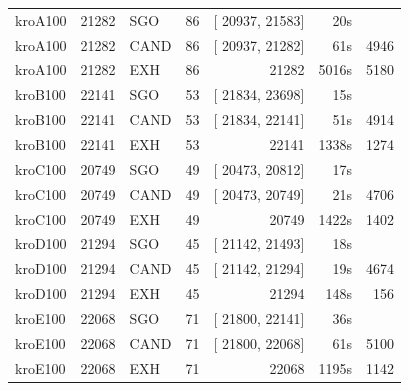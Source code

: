 \documentclass[a4paper,11pt,twoside]{book}
\begin{document}
\begin{multicols}{2}
\begin{center}
\begin{tabular}{|lrlrrrr|}
kroA100      &    21282 &  SGO &  86 & [ 20937, 21583] &    20s & \\
kroA100      &    21282 & CAND &  86 & [ 20937, 21282] &    61s &    4946 \\
kroA100      &    21282 &  EXH &  86 &           21282 &  5016s &    5180 \\
kroB100      &    22141 &  SGO &  53 & [ 21834, 23698] &    15s & \\
kroB100      &    22141 & CAND &  53 & [ 21834, 22141] &    51s &    4914 \\
kroB100      &    22141 &  EXH &  53 &           22141 &  1338s &    1274 \\
kroC100      &    20749 &  SGO &  49 & [ 20473, 20812] &    17s & \\
kroC100      &    20749 & CAND &  49 & [ 20473, 20749] &    21s &    4706 \\
kroC100      &    20749 &  EXH &  49 &          20749  &  1422s &    1402 \\
kroD100      &    21294 &  SGO &  45 & [ 21142, 21493] &    18s & \\
kroD100      &    21294 & CAND &  45 & [ 21142, 21294] &    19s &    4674 \\
kroD100      &    21294 &  EXH &  45 &          21294  &   148s &     156 \\
kroE100      &    22068 &  SGO &  71 & [ 21800, 22141] &    36s & \\
kroE100      &    22068 & CAND &  71 & [ 21800, 22068] &    61s &    5100 \\
kroE100      &    22068 &  EXH &  71 &           22068 &  1195s &    1142 \\
\hline
\end{tabular}
\end{center}


\end{multicols}
\end{document}
